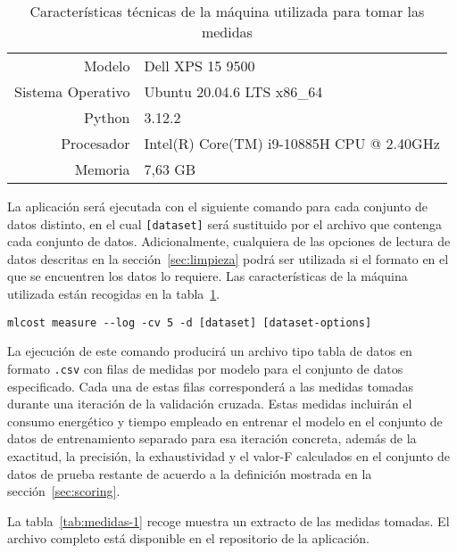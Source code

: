 \begin{table}[h]
    \centering
    \begin{tabular}{rl}
         Modelo & Dell XPS 15 9500\\
         Sistema Operativo & Ubuntu 20.04.6 LTS x86\_64\\
         Python & 3.12.2\\
         Procesador & Intel(R) Core(TM) i9-10885H CPU @ 2.40GHz\\
         Memoria & 7,63 GB\\
    \end{tabular}
    \caption{Características técnicas de la máquina utilizada para tomar las medidas}
    \label{tab:caracteristicas-tecnicas}
\end{table}

La aplicación será ejecutada con el siguiente comando para cada conjunto de datos distinto, en el cual \texttt{[dataset]} será sustituido por el archivo que contenga cada conjunto de datos. Adicionalmente, cualquiera de las opciones de lectura de datos descritas en la sección~\ref{sec:limpieza} podrá ser utilizada si el formato en el que se encuentren los datos lo requiere. Las características de la máquina utilizada están recogidas en la tabla~\ref{tab:caracteristicas-tecnicas}.
\begin{verbatim}
mlcost measure --log -cv 5 -d [dataset] [dataset-options]
\end{verbatim}

La ejecución de este comando producirá un archivo tipo tabla de datos en formato \texttt{.csv} con filas de medidas por modelo para el conjunto de datos especificado. Cada una de estas filas corresponderá a las medidas tomadas durante una iteración de la validación cruzada. Estas medidas incluirán el consumo energético y tiempo empleado en entrenar el modelo en el conjunto de datos de entrenamiento separado para esa iteración concreta, además de la exactitud, la precisión, la exhaustividad y el valor-F calculados en el conjunto de datos de prueba restante de acuerdo a la definición mostrada en la sección~\ref{sec:scoring}.

La tabla~\ref{tab:medidas-1} recoge muestra un extracto de las medidas tomadas. El archivo completo está disponible en el repositorio de la aplicación.

